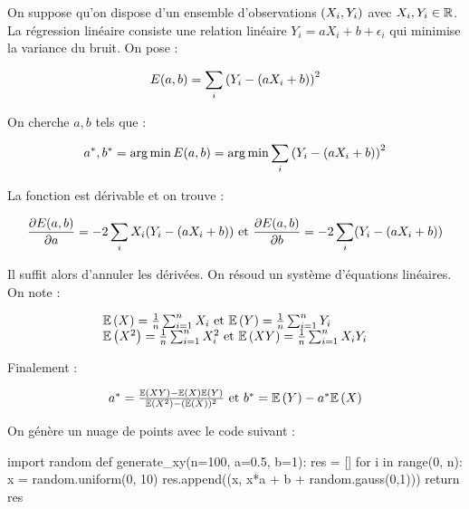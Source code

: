 %




\exosubject{}
\begin{xexercice}\label{td_note_label1_2017}%

On suppose qu'on dispose d'un ensemble d'observations $\left(X_i, Y_i\right)$ avec $X_i, Y_i \in \mathbb{R}$.
La régression linéaire consiste une relation linéaire $Y_i = a X_i + b + \epsilon_i$
qui minimise la variance du bruit. On pose :

$$
E(a, b) = \sum_i \left(Y_i - (a X_i + b)\right)^2
$$


On cherche $a, b$ tels que :

$$
a^*, b^* = \arg \min E(a, b) = \arg \min \sum_i \left(Y_i - (a X_i + b)\right)^2
$$

La fonction est dérivable et on trouve :

$$
\frac{\partial E(a,b)}{\partial a} = - 2 \sum_i X_i ( Y_i - (a X_i + b))
\text{ et } \frac{\partial E(a,b)}{\partial b} = - 2 \sum_i ( Y_i - (a X_i + b))
$$

Il suffit alors d'annuler les dérivées. On résoud un système d'équations linéaires. On note :

$$
\begin{array}{l}
\mathbb{E}\left(X\right) = \frac{1}{n}\sum_{i=1}^n X_i \text{ et } \mathbb{E}\left(Y\right) = \frac{1}{n}\sum_{i=1}^n Y_i \\
\mathbb{E}\left(X^2\right) = \frac{1}{n}\sum_{i=1}^n X_i^2 \text{ et } \mathbb{E}\left(XY\right) = \frac{1}{n}\sum_{i=1}^n X_i Y_i 
\end{array}
$$

Finalement :

$$
\begin{array}{l}
a^* = \frac{ \mathbb{E}\left(XY\right) - \mathbb{E}\left(X\right) \mathbb{E}\left(Y\right)}{\mathbb{E}\left(X^2\right) - (\mathbb{E}\left(X\right))^2} \text{ et } b^* = \mathbb{E}\left(Y\right) - a^* \mathbb{E}\left(X\right)
\end{array}
$$

On génère un nuage de points avec le code suivant :

\begin{verbatimx}
import random
def generate_xy(n=100, a=0.5, b=1):
    res = []
    for i in range(0, n):
        x = random.uniform(0, 10)
        res.append((x, x*a + b + random.gauss(0,1)))
    return res
\end{verbatimx}


\end{xexercice}
